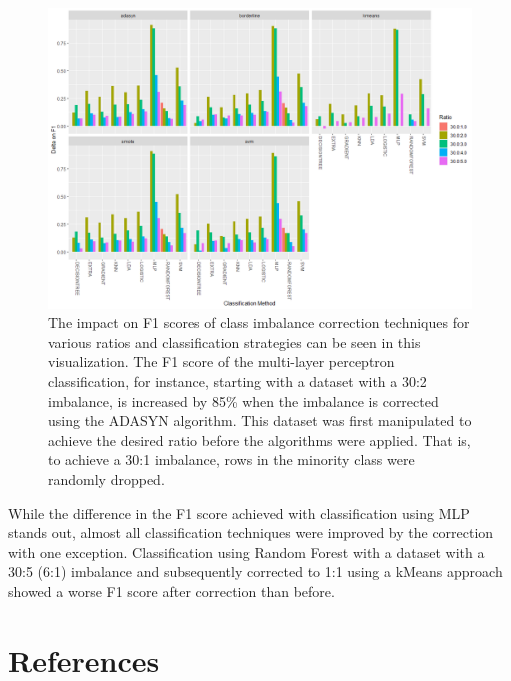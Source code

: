 \documentclass[letterpaper]{article}
\begin{document}
\begin{figure}[H]
	\centering
	\includegraphics[width=0.9\linewidth]{./figures/imbalance.png}
	\caption[Class imbalance correction techniques]{The impact on F1 scores of class imbalance correction techniques for various ratios and classification strategies can be seen in this visualization. The F1 score of the multi-layer perceptron classification, for instance, starting with a dataset with a 30:2 imbalance, is increased by 85\% when the imbalance is corrected using the ADASYN algorithm. This dataset was first manipulated to achieve the desired ratio before the algorithms were applied. That is, to achieve a 30:1 imbalance, rows in the minority class were randomly dropped.}
	\label{fig:imbalance}
\end{figure}

While the difference in the F1 score achieved with classification using MLP stands out, almost all classification techniques were improved by the correction with one exception. Classification using Random Forest with a dataset with a 30:5 (6:1) imbalance and subsequently corrected to 1:1 using a kMeans approach showed a worse F1 score after correction than before.



\newpage
\section{References}
\printbibliography[heading=none]

\end{document}
